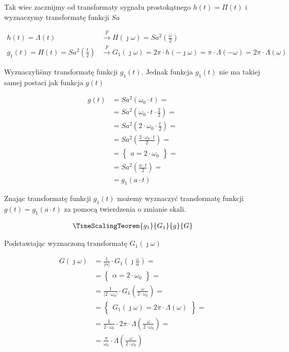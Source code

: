 \begin{task}
Tak wiec zacznijmy od transformaty sygnału prostokątnego $h(t)=\Pi(t)$ i wyznaczymy transformatę funkcji $Sa$

\begin{align*}
h(t)=\Lambda(t) &\overset{F}{\rightarrow} H(\jmath \omega) = Sa^2\left(\frac{\omega}{2}\right)\\
g_1(t) = H(t) = Sa^2\left(\frac{t}{2}\right) &\overset{F}{\rightarrow} 
G_1(\jmath \omega) = 2\pi \cdot h(- \jmath \omega) = \pi \cdot  \Lambda\left(-\omega\right) = 2\pi \cdot  \Lambda\left(\omega\right)
\end{align*}

Wyznaczyliśmy transformatę funkcji $g_1(t)$. Jednak funkcja $g_1(t)$ nie ma takiej samej postaci jak funkcja $g(t)$ 

\begin{align*}
g(t)&=Sa^2\left(\omega_0 \cdot t\right)=\\
&=Sa^2\left(\omega_0 \cdot t \cdot \frac{2}{2}\right)=\\
&=Sa^2\left(2\cdot \omega_0 \cdot \frac{t}{2}\right)=\\
&=Sa^2\left(\frac{2\cdot \omega_0 \cdot t}{2}\right)=\\
&=\begin{Bmatrix}
a = 2\cdot \omega_0
\end{Bmatrix}=\\
&=Sa^2\left(\frac{a\cdot t}{2}\right)=\\
&=g_1(a\cdot t) 
\end{align*}

Znając transformatę funkcji $g_1(t)$ możemy wyznaczyć transformatę funkcji $g(t)=g_1(a \cdot t)$ za pomocą twierdzenia o zmianie skali.

\begin{align*}
\TimeScalingTeorem{g_1}{G_1}{g}{G}
\end{align*}

Podstawiając wyznaczoną transformatę $G_1(\jmath \omega)$

\begin{align*}
G(\jmath \omega) &= \frac{1}{\left|\alpha \right|} \cdot G_1(\jmath \frac{\omega}{\alpha})=\\
&=\begin{Bmatrix}
\alpha = 2\cdot \omega_0
\end{Bmatrix}=\\
&=\frac{1}{\left| 2\cdot \omega_0 \right|} \cdot G_1( \frac{\omega}{2\cdot \omega_0})=\\
&=\begin{Bmatrix}
G_1(\jmath \omega) = 2\pi \cdot \Lambda\left(\omega\right)
\end{Bmatrix}=\\
&=\frac{1}{ 2\cdot \omega_0 } \cdot 2\pi \cdot \Lambda\left( \frac{\omega}{2\cdot \omega_0}\right)=\\
&=\frac{\pi}{ \omega_0 } \cdot \Lambda\left( \frac{\omega}{2\cdot \omega_0}\right)
\end{align*}


\end{task}
